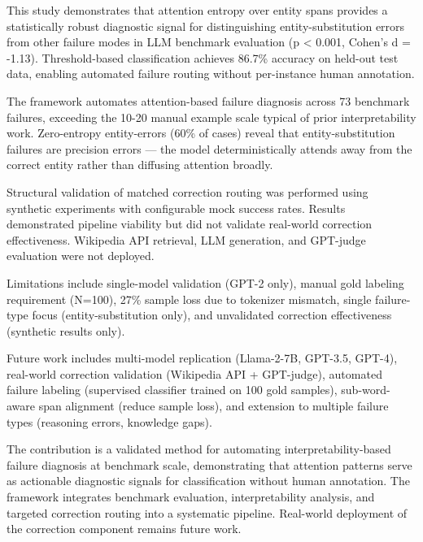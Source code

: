 
This study demonstrates that attention entropy over entity spans provides a statistically robust diagnostic signal for distinguishing entity-substitution errors from other failure modes in LLM benchmark evaluation (p < 0.001, Cohen's d = -1.13). Threshold-based classification achieves 86.7\% accuracy on held-out test data, enabling automated failure routing without per-instance human annotation.

The framework automates attention-based failure diagnosis across 73 benchmark failures, exceeding the 10-20 manual example scale typical of prior interpretability work. Zero-entropy entity-errors (60\% of cases) reveal that entity-substitution failures are precision errors --- the model deterministically attends away from the correct entity rather than diffusing attention broadly.

Structural validation of matched correction routing was performed using synthetic experiments with configurable mock success rates. Results demonstrated pipeline viability but did not validate real-world correction effectiveness. Wikipedia API retrieval, LLM generation, and GPT-judge evaluation were not deployed.

Limitations include single-model validation (GPT-2 only), manual gold labeling requirement (N=100), 27\% sample loss due to tokenizer mismatch, single failure-type focus (entity-substitution only), and unvalidated correction effectiveness (synthetic results only).

Future work includes multi-model replication (Llama-2-7B, GPT-3.5, GPT-4), real-world correction validation (Wikipedia API + GPT-judge), automated failure labeling (supervised classifier trained on 100 gold samples), sub-word-aware span alignment (reduce sample loss), and extension to multiple failure types (reasoning errors, knowledge gaps).

The contribution is a validated method for automating interpretability-based failure diagnosis at benchmark scale, demonstrating that attention patterns serve as actionable diagnostic signals for classification without human annotation. The framework integrates benchmark evaluation, interpretability analysis, and targeted correction routing into a systematic pipeline. Real-world deployment of the correction component remains future work.
